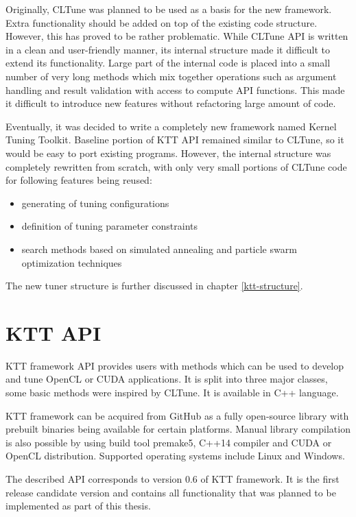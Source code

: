 \documentclass
[
    digital, %
    oneside, %
    table, %
    nolof, %
    nolot, %
    nocover %
]{fithesis3}
\begin{document}
Originally, CLTune was planned to be used as a basis for the new framework. Extra functionality should be added on top of the existing code structure.
However, this has proved to be rather problematic. While CLTune API is written in a clean and user-friendly manner, its internal structure made it
difficult to extend its functionality. Large part of the internal code is placed into a small number of very long methods which mix together operations
such as argument handling and result validation with access to compute API functions. This made it difficult to introduce new features without refactoring
large amount of code.

Eventually, it was decided to write a completely new framework named Kernel Tuning Toolkit. Baseline portion of KTT API remained similar to CLTune,
so it would be easy to port existing programs. However, the internal structure was completely rewritten from scratch, with only very small portions
of CLTune code for following features being reused:
\begin{itemize}
    \item generating of tuning configurations
    \item definition of tuning parameter constraints
    \item search methods based on simulated annealing and particle swarm optimization techniques
\end{itemize}
The new tuner structure is further discussed in chapter \ref{ktt-structure}.

\section{KTT API}
KTT framework API provides users with methods which can be used to develop and tune OpenCL or CUDA applications. It is split into three major
classes, some basic methods were inspired by CLTune. It is available in C++ language.

KTT framework can be acquired from GitHub as a fully open-source library with prebuilt binaries being available for certain platforms. Manual library
compilation is also possible by using build tool premake5, C++14 compiler and CUDA or OpenCL distribution. Supported operating systems include Linux
and Windows.

The described API corresponds to version 0.6 of KTT framework. It is the first release candidate version and contains all functionality that was
planned to be implemented as part of this thesis.
\end{document}
